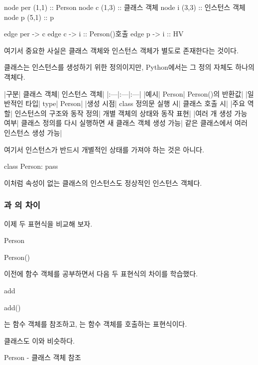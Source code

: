 \begin{dhkdiagram}[in=6]
node per (1,1) :: Person
node c (1,3) :: 클래스 객체
node i (3,3) :: 인스턴스 객체
node p (5,1) :: p

edge per -> c
edge c -> i :: Person()호출
edge p -> i :: HV
\end{dhkdiagram}

여기서 중요한 사실은 클래스 객체와 인스턴스 객체가 별도로 존재한다는 것이다.

클래스는 인스턴스를 생성하기 위한 정의이지만, Python에서는 그 정의 자체도 하나의 객체다.

\begin{dhktable}
|구분|	클래스 객체|	인스턴스 객체|
|:---|:---|:---|
|예시|	Person|	Person()의 반환값|
|일반적인 타입|	type|	Person|
|생성 시점|	class 정의문 실행 시|	클래스 호출 시|
|주요 역할|	인스턴스의 구조와 동작 정의|	개별 객체의 상태와 동작 표현|
|여러 개 생성 가능 여부|	클래스 정의를 다시 실행하면 새 클래스 객체 생성 가능|	같은 클래스에서 여러 인스턴스 생성 가능|
\end{dhktable}

여기서 인스턴스가 반드시 개별적인 상태를 가져야 하는 것은 아니다.

\begin{dhkcode}
class Person:
    pass
\end{dhkcode}

이처럼 속성이 없는 클래스의 인스턴스도 정상적인 인스턴스 객체다.

\subsubsection{과 의 차이}

이제 두 표현식을 비교해 보자.

\begin{dhkcode}
Person

Person()
\end{dhkcode}

이전에 함수 객체를 공부하면서 다음 두 표현식의 차이를 학습했다.

\begin{dhkcode}
add

add()
\end{dhkcode}

는 함수 객체를 참조하고, 는 함수 객체를 호출하는 표현식이다.

클래스도 이와 비슷하다.

\begin{dhknote}
\begin{dhksmry}[centered]
Person - 클래스 객체 참조
\end{dhksmry}
\end{dhknote}

